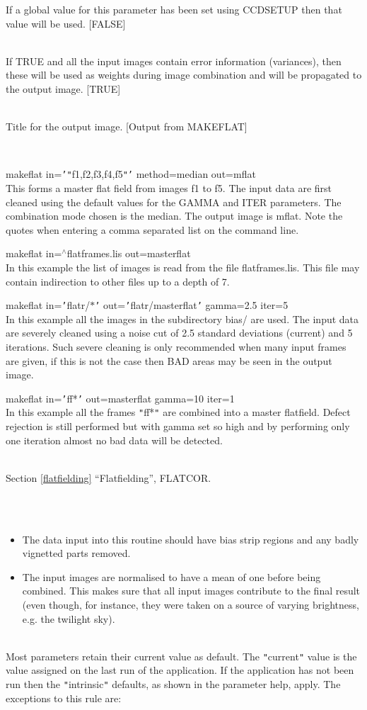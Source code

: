 \documentclass[twoside,11pt]{article}
\newcommand{\htmlref}[2]{#1}
\newcommand{\latexhtml}[2]{#1}
\renewcommand{\_}{\texttt{\symbol{95}}}
\newcommand{\qt}[1]{{\tt "}#1{\tt "}}
\newcommand{\qs}[1]{{\tt '}#1{\tt '}}
\newcommand{\xroutine}[1]{\htmlref{{\sc #1}}{#1}}
\newcommand{\secref}[2]{\latexhtml{Section \ref{#1} ``#2''}{``\htmlref{#2}{#1}''}}
\newcommand{\sstexamples}[1]{
   \item[Examples:] \mbox{} \\
   \vspace{-3.5ex}
   \begin{description}
      #1
   \end{description}
}
\newcommand{\sstsubsection}[1]{ \item[{#1}] \mbox{} \\}
\newcommand{\sstexamplesubsection}[2]{\sloppy \item{\ssttt #1} \mbox{} \\ #2 }
\newcommand{\sstnotes}[1]{\item[Notes:] \mbox{} \\[1.3ex] #1}
\newcommand{\sstdiytopic}[2]{\item[#1:] \mbox{} \\[1.3ex] #2}
\newcommand{\sstitemlist}[1]{
  \mbox{} \\
  \vspace{-3.5ex}
  \begin{itemize}
     #1
  \end{itemize}
}
\newcommand{\sstitem}{\item}
\newcommand{\sstexamples}[1]{
      \item[Examples:] \\
      \begin{description}
         #1
      \end{description}
      \\
   }
\newcommand{\sstsubsection}[1]{\item[{#1}]}
\newcommand{\sstexamplesubsection}[2]{\item[{\ssttt #1}] #2}
\newcommand{\sstnotes}[1]{\item[Notes:] #1 }
\newcommand{\sstdiytopic}[2]{\item[{#1:}] #2 }
\newcommand{\sstitemlist}[1]{
      \begin{itemize}
         #1
      \end{itemize}
      \\
   }
\newcommand{\sstitem}{\item}
\begin{document}
{{{         If a global value for this parameter has been set using 
         \xroutine{CCDSETUP} then that value will be used. 
         [FALSE]
      }
      \sstsubsection{
         USEVAR = \_LOGICAL (Read)
      } {
         If TRUE and all the input images contain error information
         (variances), then these will be used as weights during image
         combination and will be propagated to the output image.
         [TRUE]
      }
      \sstsubsection{
         TITLE = LITERAL (Read)
      } {
         Title for the output image.
         [Output from MAKEFLAT]
      }
   }
   \sstexamples{
      \sstexamplesubsection{
         makeflat in=\qs{\qt{f1,f2,f3,f4,f5}} method=median out=mflat
      } {
         This forms a master flat field from images f1 to f5. The input
         data are first cleaned using the default values for the GAMMA
         and ITER parameters. The combination mode chosen is the
         median.  The output image is mflat. Note the quotes when
         entering a comma separated list on the command line.
      }
      \sstexamplesubsection{
         makeflat in=$^\wedge$flat\_frames.lis out=master\_flat
      } {
         In this example the list of images is read from the file
         flat\_frames.lis. This file may contain indirection to other files
         up to a depth of 7.
      }
      \sstexamplesubsection{
         makeflat in=\qs{flatr/$*$} out=\qs{flatr/master\_flat}
         gamma=2.5 iter=5
      } {
         In this example all the images in the subdirectory bias/ are
         used. The input data are severely cleaned using a noise cut
         of 2.5 standard deviations (current) and 5 iterations. Such
         severe cleaning is only recommended when many input frames
         are given, if this is not the case then BAD areas may be seen
         in the output image.
      }
      \sstexamplesubsection{
        makeflat in=\qs{ff*} out=master\_flat gamma=10 iter=1
      } {
        In this example all the frames \qt{ff*} are combined into a master
        flatfield. Defect rejection is still performed but with
        gamma set so high and by performing only one iteration
        almost no bad data will be detected.
      }
   }
   \sstdiytopic{
      See also
   } {
      \secref{flatfielding}{Flatfielding}, 
      \xroutine{FLATCOR}.
   }
   \sstnotes{
      \sstitemlist{

         \sstitem
         The data input into this routine should have bias strip
         regions and any badly vignetted parts removed.

         \sstitem 
         The input images are normalised to have a mean of one
         before being combined. This makes sure that all input images
         contribute to the final result (even though, for instance,
         they were taken on a source of varying brightness, e.g. the 
         twilight sky).
      }
   }
   \sstdiytopic{
      Behaviour of parameters
   } {
      Most parameters retain their current value as default. The
      \qt{current} value is the value assigned on the last run of the
      application. If the application has not been run then the
      \qt{intrinsic} defaults, as shown in the parameter help, apply.
      The exceptions to this rule are:
      \sstitemlist{

}}}
\end{document}
